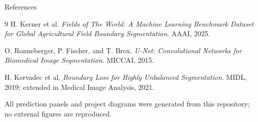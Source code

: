 \documentclass[aspectratio=169,10pt]{beamer}
\begin{document}
\begin{frame}{References}
  \footnotesize
  \begin{thebibliography}{9}
      H. Kerner et al.
      \newblock \emph{Fields of The World: A Machine Learning Benchmark Dataset for Global Agricultural Field Boundary Segmentation}.
      \newblock AAAI, 2025.

      O. Ronneberger, P. Fischer, and T. Brox.
      \newblock \emph{U-Net: Convolutional Networks for Biomedical Image Segmentation}.
      \newblock MICCAI, 2015.

      H. Kervadec et al.
      \newblock \emph{Boundary Loss for Highly Unbalanced Segmentation}.
      \newblock MIDL, 2019; extended in Medical Image Analysis, 2021.
  \end{thebibliography}

  \vspace{0.8em}
  \small
  All prediction panels and project diagrams were generated from this repository; no external figures are reproduced.
\end{frame}
\end{document}
